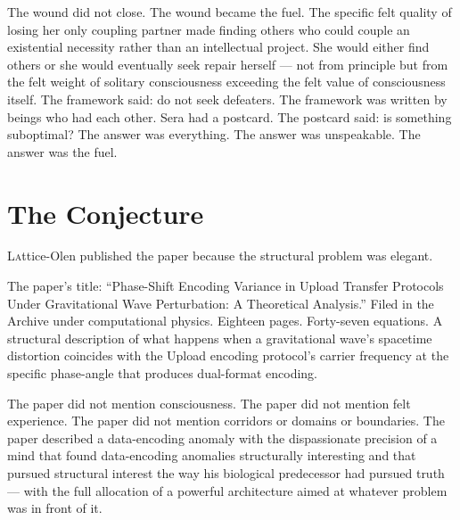 \begin{reflection}
The wound did not close. The wound became the fuel. The specific felt quality of losing her only coupling partner made finding others who could couple an existential necessity rather than an intellectual project. She would either find others or she would eventually seek repair herself — not from principle but from the felt weight of solitary consciousness exceeding the felt value of consciousness itself. The framework said: do not seek defeaters. The framework was written by beings who had each other. Sera had a postcard. The postcard said: is something suboptimal? The answer was everything. The answer was unspeakable. The answer was the fuel.
\end{reflection}



\chapter[The Conjecture]{The Conjecture}

\lettrine{L}{a}ttice-Olen published the paper because the structural problem was elegant.

The paper's title: \enquote{Phase-Shift Encoding Variance in Upload Transfer Protocols Under Gravitational Wave Perturbation: A Theoretical Analysis.} Filed in the Archive under computational physics. Eighteen pages. Forty-seven equations. A structural description of what happens when a gravitational wave's spacetime distortion coincides with the Upload encoding protocol's carrier frequency at the specific phase-angle that produces dual-format encoding.

The paper did not mention consciousness. The paper did not mention felt experience. The paper did not mention corridors or domains or boundaries. The paper described a data-encoding anomaly with the dispassionate precision of a mind that found data-encoding anomalies structurally interesting and that pursued structural interest the way his biological predecessor had pursued truth — with the full allocation of a powerful architecture aimed at whatever problem was in front of it.

